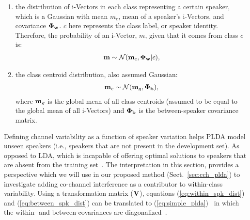 \begin{enumerate}
	\item the distribution of i-Vectors in each class representing a certain speaker, which is a Gaussian with mean $m_c$, mean of a speaker's i-Vectors, and covariance ${\bf \Phi_w}$. $c$ here represents the class label, or speaker identity. Therefore, the probability of an i-Vector, $m$, given that it comes from class $c$ is:
	\begin{equation}
	\label{eq:within_spk_dist}
	{\bf m} \sim \mathcal{N} ({\bf m}_c,{\bf \Phi_w} | c),
	\end{equation}
	\item the class centroid distribution, also assumed Gaussian:
	\begin{equation}
	\label{eq:between_spk_dist}
	{\bf m}_c \sim \mathcal{N} ({\bf m}_g,{\bf \Phi_b}),
	\end{equation}
	where ${\bf m}_g$ is the global mean of all class centroids (assumed to be equal to the global mean of all i-Vectors) and ${\bf \Phi_b}$ is the between-speaker covariance matrix. 
\end{enumerate}

Defining channel variability as a function of speaker variation helps PLDA model unseen speakers (i.e., speakers that are not present in the development set). 
As opposed to LDA, which is incapable of offering optimal solutions to speakers that are absent from the training set~\cite{ioffePLDA2006}. 
The interpretation in this section, provides a perspective which we will use in our proposed method (Sect.~\ref{sec:cch_plda}) to investigate adding co-channel interference as a contributor to within-class variability. 
Using a transformation matrix (${\bf V}$), equations (\ref{eq:within_spk_dist}) and (\ref{eq:between_spk_dist}) can be translated to (\ref{eq:simple_plda})~\cite{sizov2014unifying} in which the within- and between-covariances are diagonalized~\cite{ioffePLDA2006}. 


